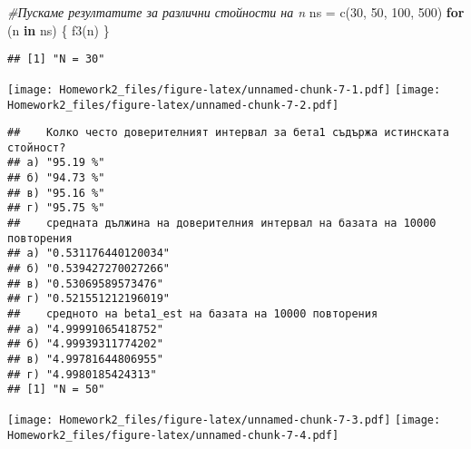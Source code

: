 \documentclass[
]{article}
\newenvironment{Shaded}{\begin{snugshade}}{\end{snugshade}}
\newcommand{\CommentTok}[1]{\textcolor[rgb]{0.56,0.35,0.01}{\textit{#1}}}
\newcommand{\ControlFlowTok}[1]{\textcolor[rgb]{0.13,0.29,0.53}{\textbf{#1}}}
\newcommand{\DecValTok}[1]{\textcolor[rgb]{0.00,0.00,0.81}{#1}}
\newcommand{\FunctionTok}[1]{\textcolor[rgb]{0.00,0.00,0.00}{#1}}
\newcommand{\NormalTok}[1]{#1}
\newcommand{\OtherTok}[1]{\textcolor[rgb]{0.56,0.35,0.01}{#1}}
\begin{document}
\begin{Shaded}
\begin{Highlighting}[]
\CommentTok{\#Пускаме резултатите за различни стойности на n}
\NormalTok{ns }\OtherTok{=} \FunctionTok{c}\NormalTok{(}\DecValTok{30}\NormalTok{, }\DecValTok{50}\NormalTok{, }\DecValTok{100}\NormalTok{, }\DecValTok{500}\NormalTok{)}
\ControlFlowTok{for}\NormalTok{ (n }\ControlFlowTok{in}\NormalTok{ ns) \{}
  \FunctionTok{f3}\NormalTok{(n)}
\NormalTok{\}}
\end{Highlighting}
\end{Shaded}

\begin{verbatim}
## [1] "N = 30"
\end{verbatim}

\texttt{[image: Homework2\_files/figure-latex/unnamed-chunk-7-1.pdf]}
\texttt{[image: Homework2\_files/figure-latex/unnamed-chunk-7-2.pdf]}

\begin{verbatim}
##    Колко често доверителният интервал за бета1 съдържа истинската стойност?
## а) "95.19 %"                                                               
## б) "94.73 %"                                                               
## в) "95.16 %"                                                               
## г) "95.75 %"                                                               
##    средната дължина на доверителния интервал на базата на 10000 повторения
## а) "0.531176440120034"                                                    
## б) "0.539427270027266"                                                    
## в) "0.53069589573476"                                                     
## г) "0.521551212196019"                                                    
##    средното на beta1_est на базата на 10000 повторения
## а) "4.99991065418752"                                 
## б) "4.99939311774202"                                 
## в) "4.99781644806955"                                 
## г) "4.9980185424313"                                  
## [1] "N = 50"
\end{verbatim}

\texttt{[image: Homework2\_files/figure-latex/unnamed-chunk-7-3.pdf]}
\texttt{[image: Homework2\_files/figure-latex/unnamed-chunk-7-4.pdf]}
\end{document}
